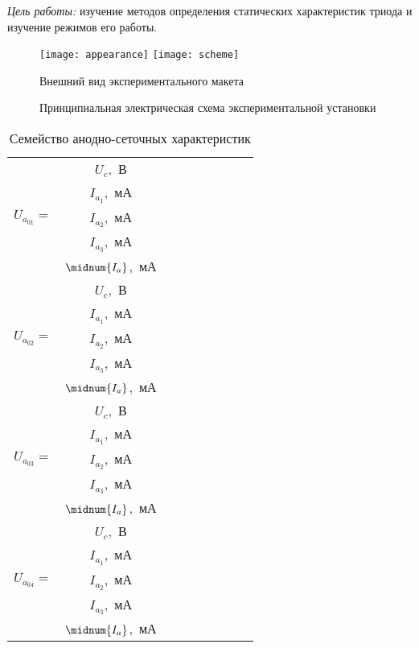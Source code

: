 \documentclass[10pt,pscyr,nonums]{hedlab}
\begin{document}
  \makeheader

  \emph{Цель работы:} изучение методов определения статических характеристик
  триода и изучение режимов его работы.
  
  \begin{figure}[h!]
    \center
    \texttt{[image: appearance]} \hspace*{2em}
    \texttt{[image: scheme]}
    \parbox{.45\textwidth}{\caption{Внешний вид экспериментального макета}}
    \hspace*{2em}
    \parbox{.4\textwidth}{\caption{Принципиальная электрическая схема
    экспериментальной установки}}
  \end{figure}
  
  \begin{table}[h!]
    \center
    \caption{Семейство анодно-сеточных характеристик}
    \begin{tabular}{|m{}|*{8}{C{.07}|}} \hline
     & \( U_c \),~В &
      &&&&&& \\ 
    & \( I_{a_1} \),~мА &
      &&&&&& \\ 
    & \( I_{a_2} \),~мА &
      &&&&&& \\ 
    & \( I_{a_3} \),~мА &
      &&&&&& \\ 
    & \( \midnum{I_a} \),~мА &
      &&&&&& \\ \hline
     & \( U_c \),~В &
      &&&&&& \\ 
    & \( I_{a_1} \),~мА &
      &&&&&& \\ 
    & \( I_{a_2} \),~мА &
      &&&&&& \\ 
    & \( I_{a_3} \),~мА &
      &&&&&& \\ 
    & \( \midnum{I_a} \),~мА &
      &&&&&& \\ \hline
     & \( U_c \),~В &
      &&&&&& \\ 
    & \( I_{a_1} \),~мА &
      &&&&&& \\ 
    & \( I_{a_2} \),~мА &
      &&&&&& \\ 
    & \( I_{a_3} \),~мА &
      &&&&&& \\ 
    & \( \midnum{I_a} \),~мА &
      &&&&&& \\ \hline
     & \( U_c \),~В &
      &&&&&& \\ 
    & \( I_{a_1} \),~мА &
      &&&&&& \\ 
    & \( I_{a_2} \),~мА &
      &&&&&& \\ 
    & \( I_{a_3} \),~мА &
      &&&&&& \\ 
    & \( \midnum{I_a} \),~мА &
      &&&&&& \\ \hline
    \end{tabular}
  \end{table}
  
\end{document}
